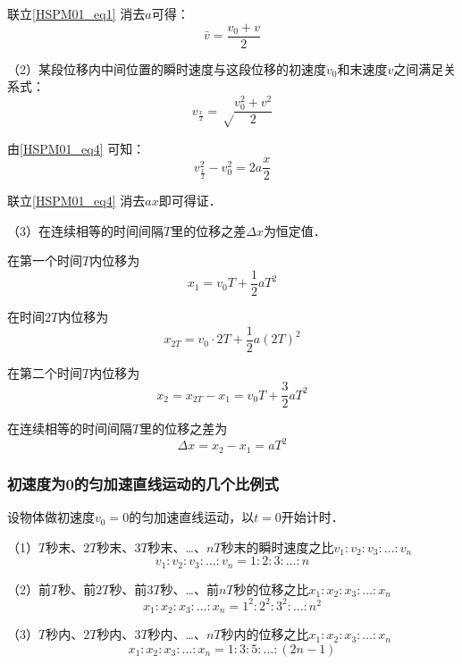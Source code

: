 联立\autoref{HSPM01_eq1} 消去$a$可得：
\begin{equation}
\bar v=\frac{v_0+v}{2}
\end{equation}

（2）某段位移内中间位置的瞬时速度与这段位移的初速度$v_0$和末速度$v$之间满足关系式：
\begin{equation}
v_\frac x2=\sqrt \frac{v_0^2+v^2}2
\end{equation}

由\autoref{HSPM01_eq4} 可知：
\begin{equation}
v_{\frac x2}^2-v_0^2=2a\frac x2
\end{equation}

联立\autoref{HSPM01_eq4} 消去$ax$即可得证．

（3）在连续相等的时间间隔$T$里的位移之差$\Delta x$为恒定值．

在第一个时间$T$内位移为
\begin{equation}
x_1=v_0T+\frac12aT^2
\end{equation}

在时间$2T$内位移为
\begin{equation}
x_{2T}=v_0\cdot2T+\frac12a(2T)^2
\end{equation}

在第二个时间$T$内位移为
\begin{equation}
x_2=x_{2T}-x_1=v_0T+\frac32aT^2
\end{equation}

在连续相等的时间间隔$T$里的位移之差为
\begin{equation}
\Delta x=x_2-x_1=aT^2
\end{equation}

\subsubsection{初速度为0的匀加速直线运动的几个比例式}
设物体做初速度$v_0=0$的匀加速直线运动，以$t=0$开始计时．

（1）$T$秒末、$2T$秒末、$3T$秒末、…、$nT$秒末的瞬时速度之比$v_1:v_2:v_3:\dots:v_n$
\begin{equation}
v_1:v_2:v_3:\dots:v_n=1:2:3:\dots:n
\end{equation}

（2）前$T$秒、前$2T$秒、前$3T$秒、…、前$nT$秒的位移之比$x_1:x_2:x_3:\dots:x_n$
\begin{equation}
x_1:x_2:x_3:\dots:x_n=1^2:2^2:3^2:\dots:n^2
\end{equation}

（3）$T$秒内、$2T$秒内、$3T$秒内、…、$nT$秒内的位移之比$x_1:x_2:x_3:\dots:x_n$
\begin{equation}
x_1:x_2:x_3:\dots:x_n=1:3:5:\dots:(2n-1)
\end{equation}

